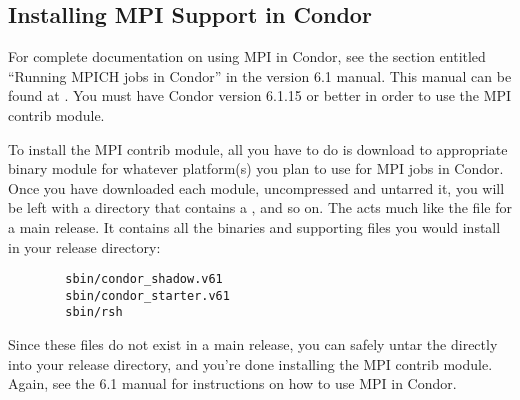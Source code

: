 \subsection{\label{sec:Install-MPI-Condor}
Installing MPI Support in Condor} 


For complete documentation on using MPI in Condor, see the section
entitled ``Running MPICH jobs in Condor'' in the version 6.1 manual.
This manual can be found at
.
You must have Condor version 6.1.15 or better in order to use the MPI
contrib module.  

To install the MPI contrib module, all you have to do is download
to appropriate binary module for whatever platform(s) you plan to use
for MPI jobs in Condor.
Once you have downloaded each module, uncompressed and untarred it, you
will be left with a directory that contains a ,
 and so on.
The  acts much like the  file for a
main release. 
It contains all the binaries and supporting files you would install in
your release directory:
\begin{verbatim}
        sbin/condor_shadow.v61
        sbin/condor_starter.v61
        sbin/rsh
\end{verbatim}

Since these files do not exist in a main release, you can safely untar
the  directly into your release directory, and you're
done installing the MPI contrib module.
Again, see the 6.1 manual for instructions on how to use MPI in
Condor.

